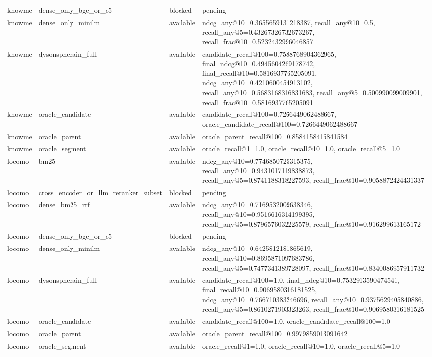 \begin{tabular}{llll}
knowme & dense_only_bge_or_e5 & blocked & pending \\
knowme & dense_only_minilm & available & ndcg_any@10=0.3655659131218387, recall_any@10=0.5, recall_any@5=0.43267326732673267, recall_frac@10=0.5232432996046857 \\
knowme & dysonspherain_full & available & candidate_recall@100=0.7588768904362965, final_ndcg@10=0.4945604269178742, final_recall@10=0.5816937765205091, ndcg_any@10=0.4210600454913102, recall_any@10=0.5683168316831683, recall_any@5=0.500990099009901, recall_frac@10=0.5816937765205091 \\
knowme & oracle_candidate & available & candidate_recall@100=0.7266449062488667, oracle_candidate_recall@100=0.7266449062488667 \\
knowme & oracle_parent & available & oracle_parent_recall@100=0.8584158415841584 \\
knowme & oracle_segment & available & oracle_recall@1=1.0, oracle_recall@10=1.0, oracle_recall@5=1.0 \\
locomo & bm25 & available & ndcg_any@10=0.7746850725315375, recall_any@10=0.9431017119838873, recall_any@5=0.8741188318227593, recall_frac@10=0.9058872424431337 \\
locomo & cross_encoder_or_llm_reranker_subset & blocked & pending \\
locomo & dense_bm25_rrf & available & ndcg_any@10=0.7169532009638346, recall_any@10=0.9516616314199395, recall_any@5=0.8796576032225579, recall_frac@10=0.916299613165172 \\
locomo & dense_only_bge_or_e5 & blocked & pending \\
locomo & dense_only_minilm & available & ndcg_any@10=0.6425812181865619, recall_any@10=0.8695871097683786, recall_any@5=0.7477341389728097, recall_frac@10=0.8340086957911732 \\
locomo & dysonspherain_full & available & candidate_recall@100=1.0, final_ndcg@10=0.7532913590474541, final_recall@10=0.9069580316181525, ndcg_any@10=0.766710383246696, recall_any@10=0.9375629405840886, recall_any@5=0.8610271903323263, recall_frac@10=0.9069580316181525 \\
locomo & oracle_candidate & available & candidate_recall@100=1.0, oracle_candidate_recall@100=1.0 \\
locomo & oracle_parent & available & oracle_parent_recall@100=0.9979859013091642 \\
locomo & oracle_segment & available & oracle_recall@1=1.0, oracle_recall@10=1.0, oracle_recall@5=1.0 \\

\end{tabular}
